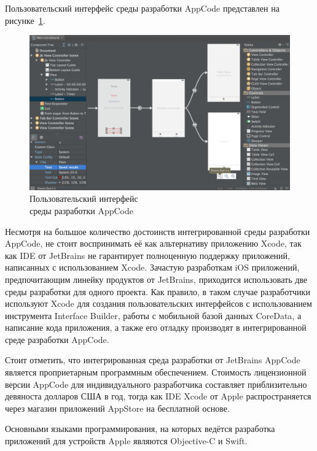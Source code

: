 Пользовательский интерфейс среды разработки AppCode представлен
на рисунке~\ref{fig:appcode}.
\begin{figure}[h!]
  \centering
  \includegraphics[width=150mm]{fig/appcode}
  \caption{Пользовательский интерфейс \\ среды разработки AppCode}
  \label{fig:appcode}
\end{figure}

Несмотря на большое количество достоинств интегрированной среды разработки AppCode,
не стоит воспринимать её как альтернативу приложению Xcode, так как
IDE от JetBrains не гарантирует полноценную поддержку приложений, написанных с
использованием Xcode. Зачастую разработкам iOS приложений, предпочитающим линейку
продуктов от JetBrains, приходится использовать две среды разработки для одного проекта.
Как правило, в таком случае разработчики используют Xcode для создания
пользовательских интерфейсов с использованием инструмента Interface Builder,
работы с мобильной базой данных CoreData, а написание кода приложения, а также
его отладку производят в интегрированной среде разработки AppCode.

Стоит отметить, что интегрированная среда разработки от JetBrains AppCode
является проприетарным программным обеспечением. Стоимость лицензионной версии AppCode
для индивидуального разработчика составляет приблизительно девяноста
долларов США в год, тогда как IDE Xcode от Apple распространяется через магазин
приложений AppStore на бесплатной основе.

Основными языками программирования, на которых ведётся разработка приложений для
устройств Apple являются Objective-C и Swift.


